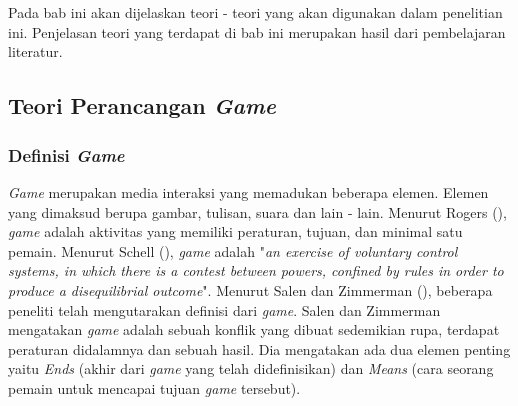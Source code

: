 \chapter{\babDua}
Pada bab ini akan dijelaskan teori - teori yang akan digunakan dalam penelitian ini. Penjelasan teori yang terdapat di bab ini merupakan hasil dari pembelajaran literatur.
\section{Teori Perancangan \textit{Game}}
	\subsection{Definisi \textit{Game}}
	\textit{Game} merupakan media interaksi yang memadukan beberapa elemen. Elemen yang dimaksud berupa gambar, tulisan, suara dan lain - lain. Menurut Rogers (\citeyear{book.lvlup}), \textit{game} adalah aktivitas yang memiliki peraturan, tujuan, dan minimal satu pemain. Menurut Schell (\citeyear{book.artgamedesign}), \textit{game} adalah "\textit{an exercise of voluntary control systems, in which there is a contest between powers, confined by rules in order to produce a disequilibrial outcome}".
	\linebreak\linebreak
	Menurut Salen dan Zimmerman (\citeyear{book.ruleofplay}), beberapa peneliti telah mengutarakan definisi dari \textit{game}. Salen dan Zimmerman mengatakan \textit{game} adalah sebuah konflik yang dibuat sedemikian rupa, terdapat peraturan didalamnya dan sebuah hasil. Dia mengatakan ada dua elemen penting yaitu \textit{Ends} (akhir dari  \textit{game} yang telah didefinisikan) dan \textit{Means} (cara seorang pemain untuk mencapai tujuan \textit{game} tersebut).
